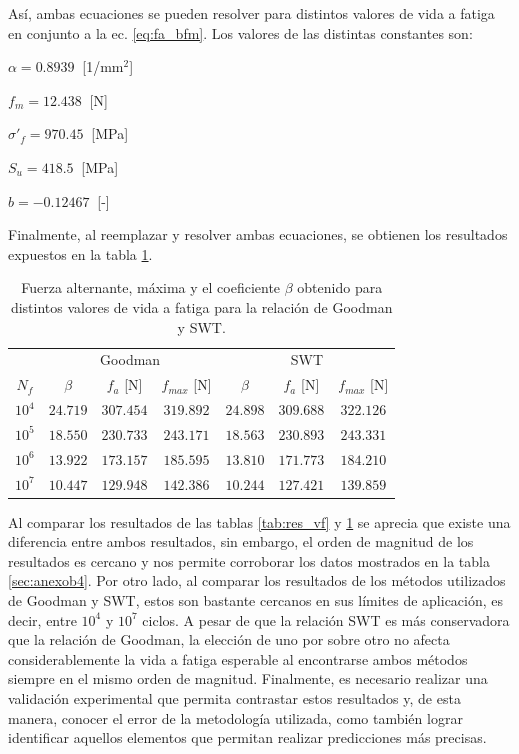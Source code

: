 Así, ambas ecuaciones se pueden resolver para distintos valores de vida a fatiga en conjunto a la ec. \ref{eq:fa_bfm}. Los valores de las distintas constantes son:
\begin{multicols}{2}
\begin{itemize*}
	\item $\alpha = 0.8939\:$ [1/mm$^2$]
	\item $f_m = 12.438\:$ [N]
	\item $\sigma'_f = 970.45\:$ [MPa]
	\item $S_u = 418.5\:$ [MPa]
	\item $b = -0.12467\:$ [-]
\end{itemize*}
\end{multicols}

Finalmente, al reemplazar y resolver ambas ecuaciones, se obtienen los resultados expuestos en la tabla \ref{tab:resfuerza_vf}.

\begin{table}[h]
\centering
\begin{tabular}{@{}ccccccc@{}}
\toprule
       & \multicolumn{3}{c}{Goodman}                  & \multicolumn{3}{c}{SWT}                      \\ \cmidrule(l){2-7} 
$N_f$  & $\beta$  & $f_a$ {[}N{]} & $f_{max}$ {[}N{]} & $\beta$  & $f_a$ {[}N{]} & $f_{max}$ {[}N{]} \\ \midrule
$10^4$ & $24.719$ & $307.454$     & $319.892$         & $24.898$ & $309.688$     & $322.126$         \\
$10^5$ & $18.550$ & $230.733$     & $243.171$         & $18.563$ & $230.893$     & $243.331$         \\
$10^6$ & $13.922$ & $173.157$     & $185.595$         & $13.810$ & $171.773$     & $184.210$         \\
$10^7$ & $10.447$ & $129.948$     & $142.386$         & $10.244$ & $127.421$     & $139.859$         \\ \bottomrule
\end{tabular}
\caption{Fuerza alternante, máxima y el coeficiente $\beta$ obtenido para distintos valores de vida a fatiga para la relación de Goodman y SWT.}
\label{tab:resfuerza_vf}
\end{table}

Al comparar los resultados de las tablas \ref{tab:res_vf} y \ref{tab:resfuerza_vf} se aprecia que existe una diferencia entre ambos resultados, sin embargo, el orden de magnitud de los resultados es cercano y nos permite corroborar los datos mostrados en la tabla \ref{sec:anexob4}. Por otro lado, al comparar los resultados de los métodos utilizados de Goodman y SWT, estos son bastante cercanos en sus límites de aplicación, es decir, entre $10^4$ y $10^7$ ciclos. A pesar de que la relación SWT es más conservadora que la relación de Goodman, la elección de uno por sobre otro no afecta considerablemente la vida a fatiga esperable al encontrarse ambos métodos siempre en el mismo orden de magnitud. Finalmente, es necesario realizar una validación experimental que permita contrastar estos resultados y, de esta manera, conocer el error de la metodología utilizada, como también lograr identificar aquellos elementos que permitan realizar predicciones más precisas.


